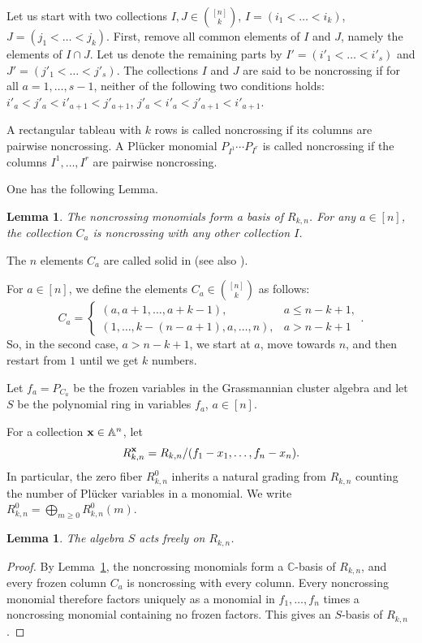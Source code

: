 \documentclass[11pt]{amsart}
\numberwithin{equation}{section}
\newtheorem{lem}[thm]{Lemma}
\newcommand{\bC}{{\mathbb C}}
\newcommand{\bA}{{\mathbb A}}
\newcommand{\bfx}{{\bf x}}
\begin{document}
Let us start with two collections $I,J\in \binom{[n]}{k}$,
$I=(i_1<\dots <i_k)$, $J=(j_1<\dots <j_k)$.
First, remove all common elements of $I$ and $J$,
namely the elements of $I\cap J$.
Let us denote the remaining parts by $I'=(i'_1<\dots <i'_s)$ and $J'=(j'_1<\dots <j'_s)$.
The collections $I$ and $J$ are said to be noncrossing if for all $a=1,\dots,s-1$,  
neither of the following two conditions holds: $i'_a<j'_a<i'_{a+1}<j'_{a+1}$,
$j'_a<i'_a<j'_{a+1}<i'_{a+1}$.

A rectangular tableau with $k$ rows is called noncrossing
if its columns are pairwise noncrossing.
A Pl\"ucker monomial $P_{I^1}\cdots P_{I^r}$
is called noncrossing if the columns
$I^1,\ldots,I^r$ are pairwise noncrossing.

One has the following Lemma.
\begin{lem}\label{lem:NC}
The noncrossing monomials form a basis of $R_{k,n}$. For any $a\in [n]$, the collection $C_a$
is noncrossing with any other collection $I$.
\end{lem}

The $n$ elements $C_a$ are called solid in \cite{PPS10} (see also \cite{SSW17}).

For $a\in [n]$, we define the elements $C_a\in\binom{[n]}{k}$ as follows:
\[
C_a = \begin{cases} (a,a+1,\dots,a+k-1), & a \le n-k+1,\\
(1,\dots,k-(n-a+1),a,\dots,n), & a > n-k+1
\end{cases}.
\]
So, in the second case, $a>n-k+1$, we start at $a$, move towards $n$, and
then restart from $1$ until we get $k$ numbers.

Let $f_a=P_{C_a}$ be the frozen variables in the Grassmannian cluster algebra
and let $S$ be the polynomial ring in variables $f_a$, $a\in [n]$.

For a collection $\bfx\in\bA^n$, let 
\[
R^\bfx_{k,n} = R_{k,n}/(f_1-x_1,\dots,f_n-x_n). 
\]
In particular, the zero fiber $R^0_{k,n}$ inherits a natural grading from $R_{k,n}$
counting the number of Pl\"ucker variables in a monomial. We write 
$R^0_{k,n}=\bigoplus_{m\ge 0} R^0_{k,n}(m)$.

\begin{lem}\label{lem:cycfree}
The algebra $S$ acts freely on $R_{k,n}$.    
\end{lem}
\begin{proof}
By Lemma~\ref{lem:NC}, the noncrossing monomials form a
$\bC$-basis of $R_{k,n}$, and every frozen column $C_a$
is noncrossing with every column. Every noncrossing monomial
therefore factors uniquely as a monomial in
$f_1,\ldots,f_n$ times a noncrossing monomial containing
no frozen factors. This gives an $S$-basis of $R_{k,n}$.
\end{proof}
\end{document}
